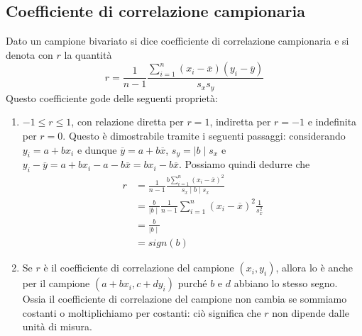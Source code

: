 \documentclass[11pt]{report}
\begin{document}
\subsection{Coefficiente di correlazione campionaria}
Dato un campione bivariato si dice coefficiente di correlazione campionaria e si denota con $r$ la quantità
\begin{equation}
    r = \frac{1}{n-1}\frac{\sum_{i=1}^{n}(x_i - \overline{x})(y_i - \overline{y})}{s_x s_y}
\end{equation}
Questo coefficiente gode delle seguenti proprietà:
\begin{enumerate}
	\item $-1 \leq r \leq 1$, con relazione diretta per $r=1$, indiretta per $r=-1$ e indefinita per $r=0$. Questo è dimostrabile tramite i seguenti passaggi: considerando $y_i = a + bx_i$ e dunque $\overline{y} = a + b\overline{x}$, $s_y = \mid b \mid s_x$ e $y_i - \overline{y} = a + bx_i - a - b\overline{x} = bx_i - b\overline{x}$. Possiamo quindi dedurre che
    \begin{equation}
        \begin{split}
            r & = \frac{1}{n-1}\frac{b\sum_{i=1}^{n}(x_i - \overline{x})^2}{s_x \mid b \mid s_x}\\
            & = \frac{b}{\mid b \mid}\frac{1}{n-1}\sum_{i=1}^{n}(x_i - \overline{x})^2\frac{1}{s^2_x}\\
            & = \frac{b}{\mid b \mid}\\
            & = sign(b)
        \end{split}
    \end{equation}
	\item Se $r$ è il coefficiente di correlazione del campione $(x_i, y_i)$, allora lo è anche per il campione $(a + bx_i, c + dy_i)$ purché $b$ e $d$ abbiano lo stesso segno. Ossia il coefficiente di correlazione del campione non cambia se sommiamo costanti o moltiplichiamo per costanti: ciò significa che $r$ non dipende dalle unità di misura.
\end{enumerate}
\end{document}
